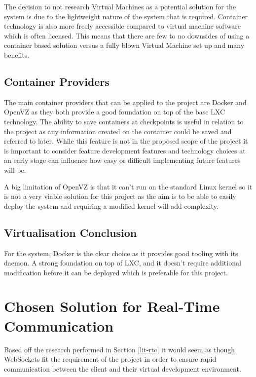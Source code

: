 The decision to not research Virtual Machines as a potential solution for the system is due to the lightweight nature of the system that is required. Container technology is also more freely accessible compared to virtual machine software which is often licensed. This means that there are few to no downsides of using a container based solution versus a fully blown Virtual Machine set up and many benefits.

\subsection{Container Providers} 

The main container providers that can be applied to the project are Docker and OpenVZ as they both provide a good foundation on top of the base LXC technology. The ability to save containers at checkpoints is useful in relation to the project as any information created on the container could be saved and referred to later. While this feature is not in the proposed scope of the project it is important to consider feature development features and technology choices at an early stage can influence how easy or difficult implementing future features will be.

A big limitation of OpenVZ is that it can't run on the standard Linux kernel so it is not a very viable solution for this project as the aim is to be able to easily deploy the system and requiring a modified kernel will add complexity.

\subsection{Virtualisation Conclusion}

For the system, Docker is the clear choice as it provides good tooling with its daemon. A strong foundation on top of LXC, and it doesn't require additional modification before it can be deployed which is preferable for this project.

\section{Chosen Solution for Real-Time Communication} \label{solapp-rtc}

Based off the research performed in Section \ref{lit-rtc} it would seem as though WebSockets fit the requirement of the project in order to ensure rapid communication between the client and their virtual development environment.

